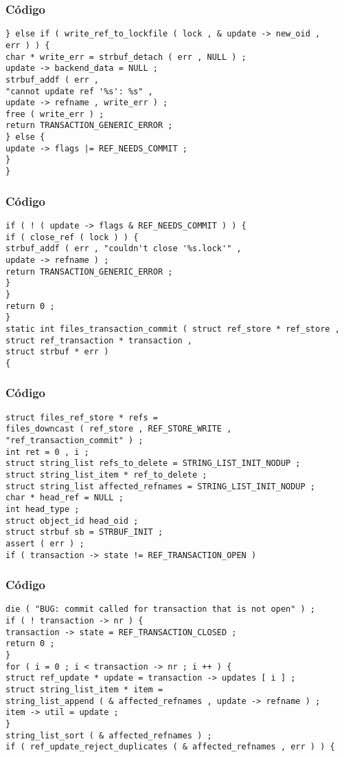 \documentclass{beamer}
\begin{document}
\begin{frame}[fragile]
\frametitle{C\'odigo}
\begin{verbatim}
} else if ( write_ref_to_lockfile ( lock , & update -> new_oid , 
err ) ) { 
char * write_err = strbuf_detach ( err , NULL ) ; 
update -> backend_data = NULL ; 
strbuf_addf ( err , 
"cannot update ref '%s': %s" , 
update -> refname , write_err ) ; 
free ( write_err ) ; 
return TRANSACTION_GENERIC_ERROR ; 
} else { 
update -> flags |= REF_NEEDS_COMMIT ; 
} 
} 
\end{verbatim}
\end{frame}
\begin{frame}[fragile]
\frametitle{C\'odigo}
\begin{verbatim}
if ( ! ( update -> flags & REF_NEEDS_COMMIT ) ) { 
if ( close_ref ( lock ) ) { 
strbuf_addf ( err , "couldn't close '%s.lock'" , 
update -> refname ) ; 
return TRANSACTION_GENERIC_ERROR ; 
} 
} 
return 0 ; 
} 
static int files_transaction_commit ( struct ref_store * ref_store , 
struct ref_transaction * transaction , 
struct strbuf * err ) 
{ 
\end{verbatim}
\end{frame}
\begin{frame}[fragile]
\frametitle{C\'odigo}
\begin{verbatim}
struct files_ref_store * refs = 
files_downcast ( ref_store , REF_STORE_WRITE , 
"ref_transaction_commit" ) ; 
int ret = 0 , i ; 
struct string_list refs_to_delete = STRING_LIST_INIT_NODUP ; 
struct string_list_item * ref_to_delete ; 
struct string_list affected_refnames = STRING_LIST_INIT_NODUP ; 
char * head_ref = NULL ; 
int head_type ; 
struct object_id head_oid ; 
struct strbuf sb = STRBUF_INIT ; 
assert ( err ) ; 
if ( transaction -> state != REF_TRANSACTION_OPEN ) 
\end{verbatim}
\end{frame}
\begin{frame}[fragile]
\frametitle{C\'odigo}
\begin{verbatim}
die ( "BUG: commit called for transaction that is not open" ) ; 
if ( ! transaction -> nr ) { 
transaction -> state = REF_TRANSACTION_CLOSED ; 
return 0 ; 
} 
for ( i = 0 ; i < transaction -> nr ; i ++ ) { 
struct ref_update * update = transaction -> updates [ i ] ; 
struct string_list_item * item = 
string_list_append ( & affected_refnames , update -> refname ) ; 
item -> util = update ; 
} 
string_list_sort ( & affected_refnames ) ; 
if ( ref_update_reject_duplicates ( & affected_refnames , err ) ) { 
\end{verbatim}
\end{frame}
\end{document}
